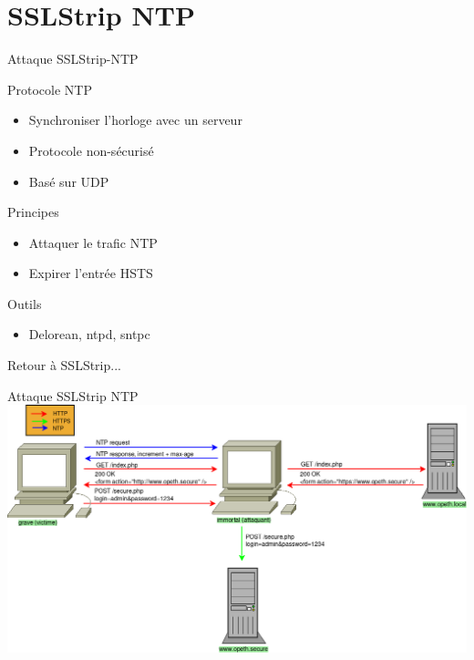 \section{SSLStrip NTP}

\begin{frame}{Attaque SSLStrip-NTP}

  \begin{block}{Protocole NTP}
    \begin{itemize}
    \item{Synchroniser l'horloge avec un serveur}
    \item{Protocole non-sécurisé}
    \item{Basé sur UDP}
    \end{itemize}
  \end{block}

  \begin{block}{Principes}
    \begin{itemize}
    \item{Attaquer le trafic NTP}
    \item{Expirer l'entrée HSTS}
    \end{itemize}
  \end{block}

  \begin{exampleblock}{Outils}
    \begin{itemize}
    \item{Delorean, ntpd, sntpc}
    \end{itemize}
  \end{exampleblock}

  {\Large \centerline{Retour à SSLStrip...}}
\end{frame}

\begin{frame}{Attaque SSLStrip NTP}
    \includegraphics[width=\linewidth]{../medias/sslstrip-ntp/attack.png}
\end{frame}
